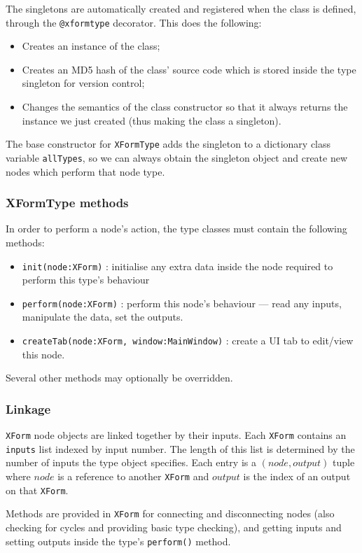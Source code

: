 The singletons are automatically created and registered when the class
is defined, through the \texttt{@xformtype} decorator. This does the
following:
\begin{itemize}
\item Creates an instance of the class;
\item Creates an MD5 hash of the class' source code which is stored
inside the type singleton for version control;
\item Changes the semantics of the class constructor so that
it always returns the instance we just created (thus making the class
a singleton).
\end{itemize}
The base constructor for \texttt{XFormType} adds the singleton
to a dictionary class variable \texttt{allTypes}, so we can always
obtain the singleton object and create new nodes which perform that
node type.

\subsubsection{XFormType methods}
In order to perform a node's action, the type classes must contain
the following methods:
\begin{itemize}
\item \texttt{init(node:XForm)} : initialise any extra data inside
the node required to perform this type's behaviour
\item \texttt{perform(node:XForm)} : perform this node's behaviour ---
read any inputs, manipulate the data, set the outputs.
\item \texttt{createTab(node:XForm, window:MainWindow)} : create a UI tab to edit/view this node.
\end{itemize}
Several other methods may optionally be overridden.

\subsubsection{Linkage}
\texttt{XForm} node objects are linked together by their inputs.
Each \texttt{XForm} contains an \texttt{inputs} list indexed by
input number. The length of this list is determined by the number
of inputs the type object specifies. Each entry is a $(node,output)$
tuple where $node$ is a reference to another \texttt{XForm} and
$output$ is the index of an output on that \texttt{XForm}.

Methods are provided in \texttt{XForm} for connecting and disconnecting nodes
(also checking for cycles and providing basic type checking), and getting inputs
and setting outputs inside the type's \texttt{perform()} method.

